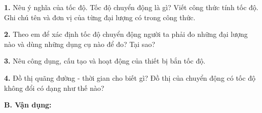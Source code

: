 \documentclass[11pt,a4paper]{article}
\begin{document}
\textbf{1.} Nêu ý nghĩa của tốc độ. Tốc độ chuyển động là gì? Viết công thức tính tốc độ. Ghi chú tên và đơn vị của từng đại lượng có trong công thức.
\par\vspace{1pt}\noindent\dotfill\par\vspace{3pt}\noindent\dotfill\par\vspace{3pt}\noindent\dotfill\par\vspace{3pt}\noindent
\textbf{2.} Theo em để xác định tốc độ chuyển động người ta phải đo những đại lượng nào và dùng những dụng cụ nào để đo? Tại sao?
\par\vspace{1pt}\noindent\dotfill\par\vspace{3pt}\noindent\dotfill\par\vspace{3pt}\noindent\dotfill\par\vspace{3pt}\noindent
\textbf{3.} Nêu công dụng, cấu tạo và hoạt động của thiết bị bắn tốc độ.
\par\vspace{1pt}\noindent\dotfill\par\vspace{3pt}\noindent\dotfill\par\vspace{3pt}\noindent\dotfill\par\vspace{3pt}\noindent\dotfill\par\vspace{3pt}\noindent
\textbf{4.} Đồ thị quãng đường - thời gian cho biết gì? Đồ thị của chuyển động có tốc độ không đổi có dạng như thế nào?
\par\vspace{1pt}\noindent\dotfill\par\vspace{3pt}\noindent\dotfill\par\vspace{3pt}\noindent\dotfill\par\vspace{3pt}\noindent
\vspace{4pt}
{\color{mySub}\textbf{B. Vận dụng:}}
\end{document}
